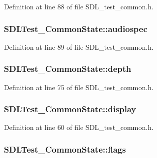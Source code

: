 Definition at line 88 of file S\-D\-L\-\_\-test\-\_\-common.\-h.

\hypertarget{struct_s_d_l_test___common_state_a2f73162e6bfe149141192fa49717d805}{
\subsubsection[{audiospec}]{ S\-D\-L\-Test\-\_\-\-Common\-State\-::audiospec}}\label{struct_s_d_l_test___common_state_a2f73162e6bfe149141192fa49717d805}


Definition at line 89 of file S\-D\-L\-\_\-test\-\_\-common.\-h.

\hypertarget{struct_s_d_l_test___common_state_a6ab7d5f81b55c29594f9ba3e018632fe}{
\subsubsection[{depth}]{ S\-D\-L\-Test\-\_\-\-Common\-State\-::depth}}\label{struct_s_d_l_test___common_state_a6ab7d5f81b55c29594f9ba3e018632fe}


Definition at line 75 of file S\-D\-L\-\_\-test\-\_\-common.\-h.

\hypertarget{struct_s_d_l_test___common_state_addb3de8e2b278deed8d2309bafd30758}{
\subsubsection[{display}]{ S\-D\-L\-Test\-\_\-\-Common\-State\-::display}}\label{struct_s_d_l_test___common_state_addb3de8e2b278deed8d2309bafd30758}


Definition at line 60 of file S\-D\-L\-\_\-test\-\_\-common.\-h.

\hypertarget{struct_s_d_l_test___common_state_a97272d03558f1f74e579ec8a5cdabc5e}{
\subsubsection[{flags}]{ S\-D\-L\-Test\-\_\-\-Common\-State\-::flags}}\label{struct_s_d_l_test___common_state_a97272d03558f1f74e579ec8a5cdabc5e}


